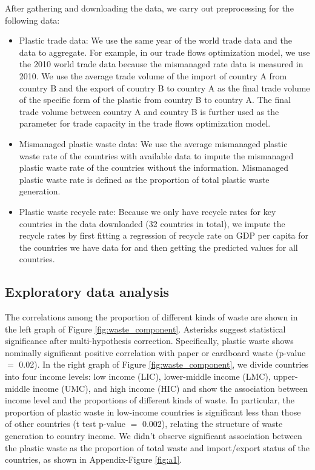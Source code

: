 \documentclass[dvipsnames]{article}
\begin{document}
\noindent After gathering and downloading the data, we carry out preprocessing for the following data:
\begin{itemize}
    \item Plastic trade data: We use the same year of the world trade data and the data to aggregate. For example, in our trade flows optimization model, we use the 2010 world trade data because the mismanaged rate data is measured in 2010. We use the average trade volume of the import of country A from country B and the export of country B to country A as the final trade volume of the specific form of the plastic from country B to country A. The final trade volume between country A and country B is further used as the parameter for trade capacity in the trade flows optimization model.
    \item Mismanaged plastic waste data: We use the average mismanaged plastic waste rate of the countries with available data to impute the mismanaged plastic waste rate of the countries without the information. Mismanaged plastic waste rate is defined as the proportion of total plastic waste generation.
    \item Plastic waste recycle rate: Because we only have recycle rates for key countries in the data downloaded (32 countries in total), we impute the recycle rates by first fitting a regression of recycle rate on GDP per capita for the countries we have data for and then getting the predicted values for all countries.
\end{itemize}




\subsection{Exploratory data analysis}
\label{sec:eda}

The correlations among the proportion of different kinds of waste are shown in the left graph of Figure \ref{fig:waste_component}. Asterisks suggest statistical significance after multi-hypothesis correction. 
Specifically, plastic waste shows nominally significant positive correlation with paper or cardboard waste (p-value $=$ 0.02). In the right graph of Figure \ref{fig:waste_component}, we divide countries into four income levels: low income (LIC), lower-middle income (LMC), upper-middle income (UMC), and high income (HIC) and show the association between income level and the proportions of different kinds of waste. In particular, the proportion of plastic waste in low-income countries is significant less than those of other countries (t test p-value $=$ 0.002), relating the structure of waste generation to country income. We didn't observe significant association between the plastic waste as the proportion of total waste and import/export status of the countries, as shown in Appendix-Figure \ref{fig:a1}.
\end{document}

